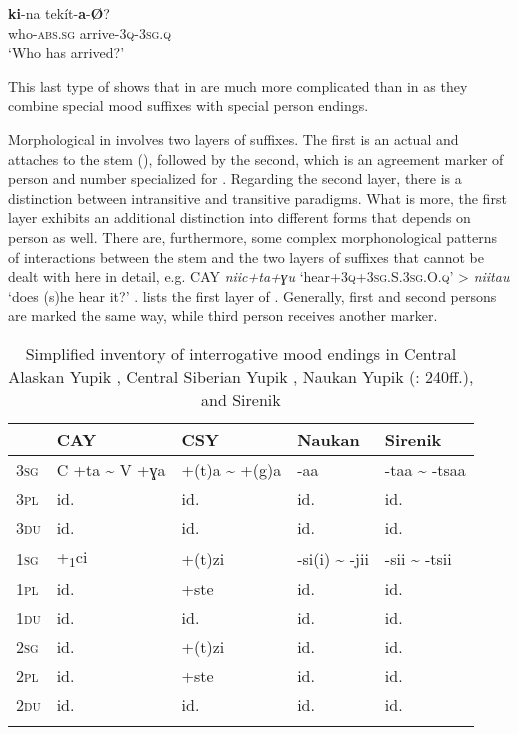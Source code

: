     \ex
    \gll \textbf{{ki}}-na    tekít-\textbf{{a}}-\textbf{{Ø}}?\\
    who-\textsc{abs.sg}  arrive-3\textsc{q-}3\textsc{sg.q}\\
    \glt ‘Who has arrived?’ \citep[167]{Miyaoka2012}
    \z
    \z

\noindent This last type of  shows that  in  are much more complicated than in  as they combine special  mood suffixes with special  person endings.

Morphological  in  involves two layers of suffixes. The first is an actual  and attaches to the stem (), followed by the second, which is an agreement marker of person and number specialized for . Regarding the second layer, there is a distinction between intransitive and transitive paradigms. What is more, the first layer exhibits an additional distinction into different forms that depends on person as well. There are, furthermore, some complex morphonological patterns of interactions between the stem and the two layers of suffixes that cannot be dealt with here in detail, e.g. CAY \textit{niic+ta+ɣu} ‘hear+3\textsc{q}+3\textsc{sg}.S.3\textsc{sg}.O.\textsc{q}’ > \textit{niitau} ‘does (s)he hear it?’ \citep[1350]{Miyaoka2012}.  lists the first layer of . Generally, first and second persons are marked the same way, while third person receives another marker.

\begin{table}
\caption{Simplified inventory of interrogative mood endings in Central Alaskan Yupik \citep[1352]{Miyaoka2012}, Central Siberian Yupik \citep[61]{Jacobson1979}, Naukan Yupik (\citealt{Menovshchikov1975}: 240ff.), and Sirenik \citep[517]{Vakhtin2000}}
\label{tab:eska:1}

\begin{tabularx}{\textwidth}{XXXXl}
\lsptoprule
& \textbf{CAY} & \textbf{\textsc{CSY}} & \textbf{Naukan} & \textbf{Sirenik}\\
\midrule
\textsc{3sg} & C +ta {\textasciitilde} V +ɣa & +(t)a {\textasciitilde} +(g)a & -aa & -taa {\textasciitilde} -tsaa\\
\textsc{3pl} & id. & id. & id. & id.\\
\textsc{3du} & id. & id. & id. & id.\\
\textsc{1sg} & +\textsubscript{1}ci & +(t)zi & -si(i) {\textasciitilde} -jii & -sii {\textasciitilde} -tsii\\
\textsc{1pl} & id. & +ste & id. & id.\\
\textsc{1du} & id. & id. & id. & id.\\
\textsc{2sg} & id. & +(t)zi & id. & id.\\
\textsc{2pl} & id. & +ste & id. & id.\\
\textsc{2du} & id. & id. & id. & id.\\
\lspbottomrule
\end{tabularx}
\end{table}

